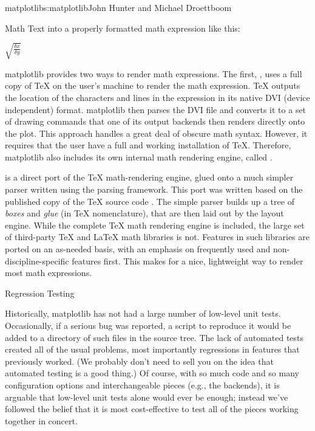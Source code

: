 \begin{aosachapter}{matplotlib}{s:matplotlib}{John Hunter and Michael Droettboom}
\begin{aosasect1}{Math Text}
\noindent into a properly formatted math expression like this:

\vspace{10px}
$\sqrt{\frac{\delta x}{\delta y}}$
\vspace{10px}

matplotlib provides two ways to render math expressions.  The first,
, uses a full copy of TeX on the user's machine to render the
math expression.  TeX outputs the location of the characters and
lines in the expression in its native DVI (device independent) format.
matplotlib then parses the DVI file and converts it to a set of
drawing commands that one of its output backends then renders directly
onto the plot.  This approach handles a great deal of obscure math
syntax. However, it requires that the user have a full and working
installation of TeX.  Therefore, matplotlib also includes its own
internal math rendering engine, called .

 is a direct port of the TeX math-rendering engine, glued
onto a much simpler parser written using the 
\cite{bib:pyparsing} parsing framework.  This port was written based
on the published copy of the TeX source code \cite{bib:texprogram}.
The simple parser builds up a tree of \emph{boxes} and \emph{glue} (in TeX
nomenclature), that are then laid out by the layout engine.  While the
complete TeX math rendering engine is included, the large set of
third-party TeX and LaTeX math libraries is not.  Features in such
libraries are ported on an as-needed basis, with an emphasis on
frequently used and non-discipline-specific features first.  This
makes for a nice, lightweight way to render most math expressions.

\end{aosasect1}

\begin{aosasect1}{Regression Testing}

Historically, matplotlib has not had a large number of low-level
unit tests.  Occasionally, if a serious bug was reported, a script
to reproduce it would be added to a directory of such files in the
source tree.  The lack of automated tests created all of the usual
problems, most importantly regressions in features that previously
worked.  (We probably don't need to sell you on the idea that
automated testing is a good thing.)  Of course, with so much code
and so many configuration options and interchangeable pieces
(e.g., the backends), it is arguable that low-level unit tests alone
would ever be enough; instead we've followed the belief that it is
most cost-effective to test all of the pieces working together in
concert.


\end{aosasect1}
\end{aosachapter}
